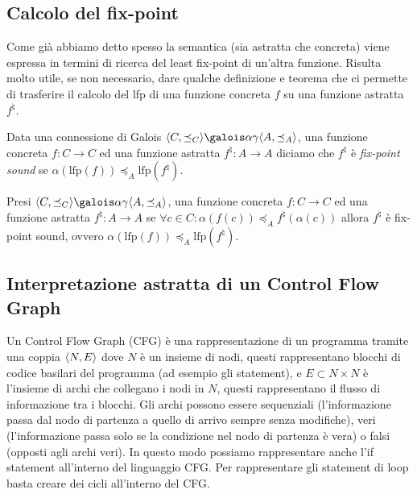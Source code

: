 \subsection{Calcolo del fix-point}
Come già abbiamo detto spesso la semantica (sia astratta che concreta) viene espressa in termini di ricerca del least fix-point di un'altra funzione. Risulta molto utile, se non necessario, dare qualche definizione e teorema che ci permette di trasferire il calcolo del lfp di una funzione concreta \(f\) su una funzione astratta \(f^{\natural}\).

\begin{definition}
Data una connessione di Galois \(\GaloisConnection{C}{A}\), una funzione concreta \(f:C\rightarrow C\) ed una funzione astratta \(f^{\natural}:A\rightarrow A\) diciamo che \(f^{\natural}\) è \textit{fix-point sound} se \(\alpha(\textrm{lfp}(f))\preceq_A \textrm{lfp}(f^{\natural})\).
\end{definition}

\begin{theorem}
Presi \(\GaloisConnection{C}{A}\), una funzione concreta \(f:C\rightarrow C\) ed una funzione astratta \(f^{\natural}:A\rightarrow A\) se \(\forall c\in C: \alpha(f(c))\preceq_A f^{\natural}(\alpha(c))\) allora \(f^{\natural}\) è fix-point sound, ovvero \(\alpha(\textrm{lfp}(f))\preceq_A \textrm{lfp}(f^{\natural})\).
\end{theorem}

\subsection{Interpretazione astratta di un Control Flow Graph}

Un Control Flow Graph (CFG) è una rappresentazione di un programma tramite una coppia \(\langle N, E\rangle\) dove \(N\) è un insieme di nodi, questi rappresentano blocchi di codice basilari del programma (ad esempio gli statement), e \(E\subset N\times N\) è l'insieme di archi che collegano i nodi in \(N\), questi rappresentano il flusso di informazione tra i blocchi. Gli archi possono essere sequenziali (l'informazione passa dal nodo di partenza a quello di arrivo sempre senza modifiche), veri (l'informazione passa solo se la condizione nel nodo di partenza è vera) o falsi (opposti agli archi veri). In questo modo possiamo rappresentare anche l'if statement all'interno del linguaggio CFG. Per rappresentare gli statement di loop basta creare dei cicli all'interno del CFG.

